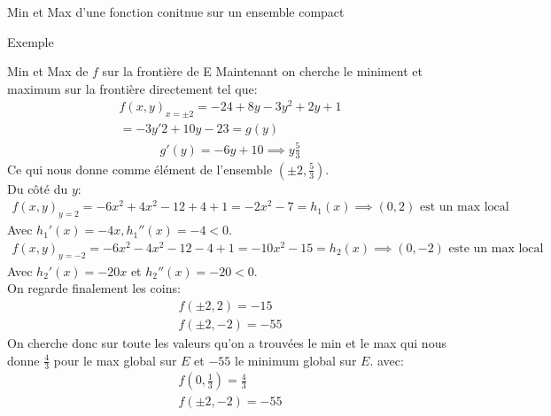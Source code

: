 \begin{parag}{Min et Max d'une fonction conitnue sur un ensemble compact}
\begin{subparag}{Exemple}
   \end{subparag}
   \begin{subparag}{Min et Max de $f$ sur la frontière de E}
       Maintenant on cherche le miniment et maximum sur la frontière directement tel que:
       \begin{align*} f\left(x, y\right)_{x = \pm 2} = -24 + 8y - 3y^2 + 2y + 1 \\
       = -3y'2 + 10 y - 23 = g\left(y\right)\end{align*}
       \begin{align*} g'\left(y\right) = -6y + 10 \implies y \frac{5}{3} \end{align*}
       Ce qui nous donne comme élément de l'ensemble $\left(\pm 2, \frac{5}{3}\right)$.\\
       Du côté du $y$:
       \begin{align*} f\left(x, y\right)_{y = 2} = -6x^2 + 4x^2 -12 + 4 + 1 = -2x^2 - 7 = h_1\left(x\right) \implies \left(0, 2\right) \text{ est un max local} \end{align*}
       Avec $h_1'\left(x\right) = -4x, h_1''\left(x\right) = -4 < 0$.\\
       \begin{align*} f\left(x, y\right)_{y = -2} = -6x^2 - 4x^2 -12 -4 + 1 = -10x^2 - 15 = h_2\left(x\right) \implies \left(0, -2\right) \text{ este un max local} \end{align*}
       Avec $h_2'\left(x\right) = -20x$ et $h_2''\left(x\right) = -20 < 0$.\\
       On regarde finalement les coins:
        \begin{align*} f\left(\pm 2, 2\right) = -15\\
        f\left(\pm 2, -2 \right) = -55\end{align*}
        On cherche donc sur toute les valeurs qu'on a trouvées le min et le max qui nous donne $\frac{4}{3}$ pour le max global sur $E$ et $-55$ le minimum global sur $E$. avec:
        \begin{align*} f\left(0, \frac{1}{3}\right) = \frac{4}{3}\\
        f\left(\pm 2, -2\right) = -55 \end{align*}

       
   \end{subparag}
\end{parag}


